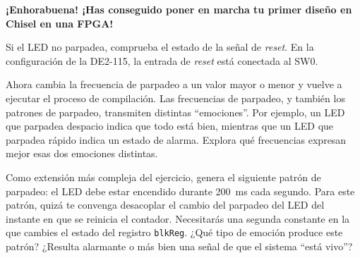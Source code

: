 \documentclass[%
    10pt,
    headinclude, footinclude=false,
    openright, %
    notitlepage,
    cleardoublepage=empty,
    headsepline,
    numbers=noenddot,
    bibliography=totoc, index=totoc,
    ]{scrbook}
\newcommand{\code}[1]{{\lstinline[basicstyle=\small\ttfamily]{#1}}}
\begin{document}
\textbf{¡Enhorabuena! ¡Has conseguido poner en marcha tu primer diseño en Chisel en una FPGA!}

Si el LED no parpadea, comprueba el estado de la señal de \emph{reset}. En la configuración de la DE2-115,
la entrada de \emph{reset} está conectada al SW0.


Ahora cambia la frecuencia de parpadeo a un valor mayor o menor y
vuelve a ejecutar el proceso de compilación. Las frecuencias de parpadeo, y también los patrones de parpadeo,
transmiten distintas ``emociones''. Por ejemplo, un LED que parpadea despacio indica que
todo está bien, mientras que un LED que parpadea rápido indica un estado de alarma.
Explora qué frecuencias expresan mejor esas dos emociones distintas.


Como extensión más compleja del ejercicio, genera el siguiente patrón de parpadeo:
el LED debe estar encendido durante 200~ms cada segundo. Para este patrón, quizá te convenga
desacoplar el cambio del parpadeo del LED del instante en que se reinicia el contador.
Necesitarás una segunda constante en la que cambies el estado del
registro \code{blkReg}. ¿Qué tipo de emoción produce este patrón?
¿Resulta alarmante o más bien una señal de que el sistema ``está vivo''?

\end{document}
